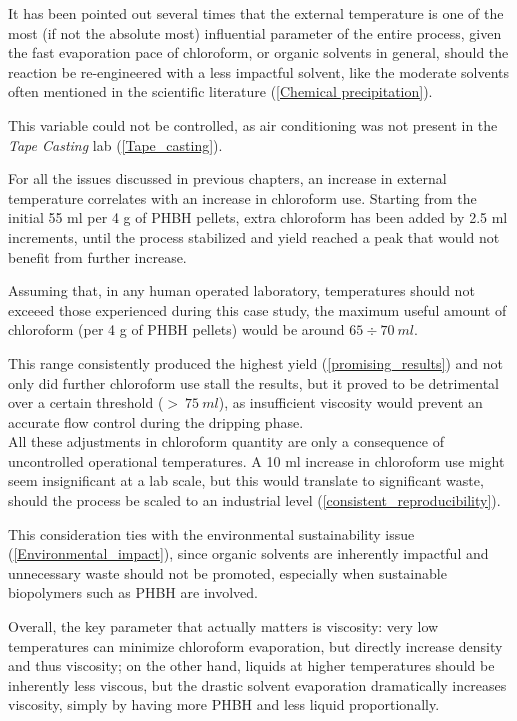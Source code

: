 \documentclass{article}
\begin{document}
        It has been pointed out several times that the external temperature is one of the most 
        (if not the absolute most) influential parameter of the entire process, given the fast evaporation pace of chloroform, 
        or organic solvents in general, should the reaction be re-engineered with a less impactful solvent, like the moderate 
        solvents often mentioned in the scientific literature (\ref{Chemical precipitation}). 

        This variable could not be controlled, as air conditioning was not present in the \textit{Tape Casting} lab 
        (\ref{Tape_casting}). 

        For all the issues discussed in previous chapters, an increase in external temperature correlates with an increase in 
        chloroform use. Starting from the initial 55 ml per 4 g of PHBH pellets, extra chloroform has been added 
        by 2.5 ml increments, until the process stabilized and yield reached a peak that would not benefit from further 
        increase. 

        Assuming that, in any human operated laboratory, temperatures should not exceeed those experienced during this case study,  
        the maximum useful amount of chloroform (per 4 g of PHBH pellets) would be around $65 \div 70 \ ml$. 

        This range consistently produced the highest yield (\ref{promising_results}) and not only did further chloroform use stall the 
        results, but it proved to be detrimental over a certain threshold ($ > \ 75 \ ml$), as insufficient 
        viscosity would prevent an accurate flow control during the dripping phase. \\ 

        All these adjustments in chloroform quantity are only a consequence of uncontrolled operational temperatures. A 10 ml 
        increase in chloroform use might seem insignificant at a lab scale, but this would translate to significant waste, 
        should the process be scaled to an industrial level (\ref{consistent_reproducibility}). 

        This consideration ties with the environmental sustainability issue (\ref{Environmental_impact}), since organic solvents are 
        inherently impactful and unnecessary waste should not be promoted, especially when sustainable biopolymers such as PHBH are involved. 

        Overall, the key parameter that actually matters is viscosity: very low temperatures can minimize chloroform evaporation, 
        but directly increase density and thus viscosity; on the other hand, liquids at higher temperatures should be inherently 
        less viscous, but the drastic solvent evaporation dramatically increases viscosity, simply by having more PHBH and less 
        liquid proportionally. \\ 
        
\end{document}
